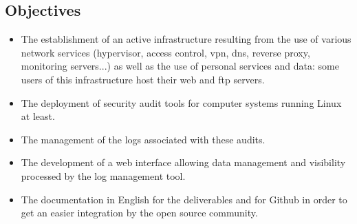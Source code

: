 \subsection{Objectives}
\begin{itemize}
\vspace{0.5cm}
\item
  The establishment of an active infrastructure resulting from the use of
  various network services (hypervisor, access control, vpn, dns, reverse
    proxy, monitoring servers...) as well as the use of personal services and data:
  some users of this infrastructure host their web and ftp servers.

\item
  The deployment of security audit tools for computer systems
  running Linux at least.

\item
  The management of the logs associated with these audits.

\item
  The development of a web interface allowing data management and visibility processed
  by the log management tool.
\item
  The documentation in English for the deliverables and for Github in order to
    get an easier integration by the open source community.
\end{itemize}

\pagebreak

